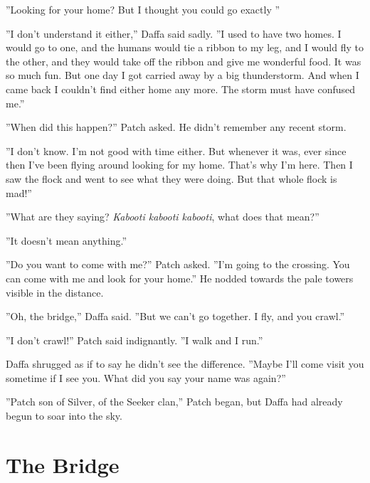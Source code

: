 \documentclass[12pt]{book}
\begin{document}
 ''Looking for your home? But I thought you could go exactly %
''\par
 ''I don't understand it either,'' Daffa said sadly. ''I used to have two homes. I would go to one, and the humans would tie a ribbon to my leg, and I would fly to the other, and they would take off the ribbon and give me wonderful food. It was so much fun. But one day I got carried away by a big thunderstorm. And when I came back I couldn't find either home any more. The storm must have confused me.''\par
 ''When did this happen?'' Patch asked. He didn't remember any recent storm.\par
 ''I don't know. I'm not good with time either. But whenever it was, ever since then I've been flying around looking for my home. That's why I'm here. Then I saw the flock and went to see what they were doing. But that whole flock is mad!''\par
 ''What are they saying? {\it Kabooti kabooti kabooti}, what does that mean?''\par
 ''It doesn't mean anything.''\par
 ''Do you want to come with me?'' Patch asked. ''I'm going to the crossing. You can come with me and look for your home.'' He nodded towards the pale towers visible in the distance.\par
 ''Oh, the bridge,'' Daffa said. ''But we can't go together. I fly, and you crawl.''\par
 ''I don't crawl!'' Patch said indignantly. ''I walk and I run.''\par
 Daffa shrugged as if to say he didn't see the difference. ''Maybe I'll come visit you sometime if I see you. What did you say your name was again?''\par
 ''Patch son of Silver, of the Seeker clan,'' Patch began, but Daffa had already begun to soar into the sky.\par

\section{The Bridge}
\end{document}
